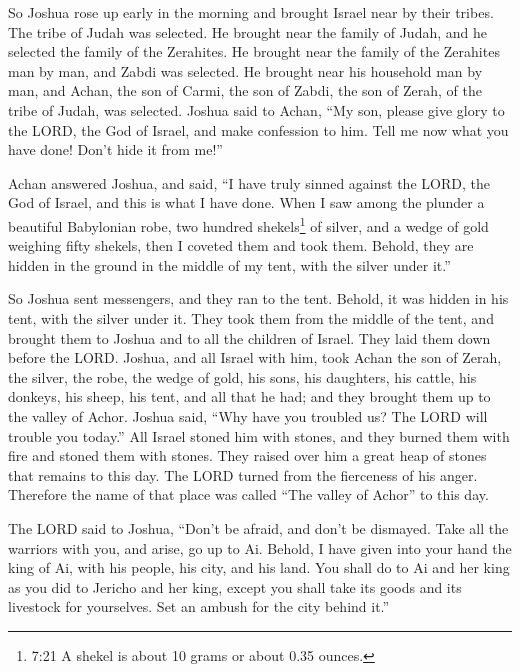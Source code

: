 \myverse{}So Joshua rose up early in the morning and brought Israel near
by their tribes. The tribe of Judah was selected.
\myverse{}He brought near the family of Judah, and he selected the family of the Zerahites.
He brought near the family of the Zerahites man by man, and Zabdi was selected.
\myverse{}He brought near his household man by man, and Achan, the son of Carmi, the
son of Zabdi, the son of Zerah, of the tribe of Judah, was selected.
\myverse{}Joshua said to Achan, “My son, please give glory to the LORD, the God of Israel,
and make confession to him. Tell me now what you have done! Don’t hide it from me!”

\myverse{}Achan answered Joshua, and said, “I have truly sinned against
the LORD, the God of Israel, and this is what I have done.
\myverse{}When I saw among the plunder a beautiful Babylonian robe, two hundred shekels\footnote{7:21 A shekel is about 10 grams or about 0.35 ounces.} of silver, and a wedge of gold weighing
fifty shekels, then I coveted them and took them. Behold, they are hidden in the ground in the middle
of my tent, with the silver under it.”

\myverse{}So Joshua sent messengers, and they ran to the tent. Behold,
it was hidden in his tent, with the silver under it.
\myverse{}They took them from the middle of the tent, and brought them to Joshua and
to all the children of Israel. They laid them down before the LORD.
\myverse{}Joshua, and all Israel with him, took Achan the son of Zerah, the silver,
the robe, the wedge of gold, his sons, his daughters, his cattle, his donkeys, his sheep, his tent, and
all that he had; and they brought them up to the valley of Achor.
\myverse{}Joshua said, “Why have you troubled us? The LORD will trouble you today.”
All Israel stoned him with stones, and they burned them with fire and stoned them with stones.
\myverse{}They raised over him a great heap of stones that remains to this day. The
LORD turned from the fierceness of his anger. Therefore the name of that place was called “The valley
of Achor” to this day.


\mychapter{} \myverse*{}The LORD said to Joshua, “Don’t be afraid, and don’t be dismayed.
Take all the warriors with you, and arise, go up to Ai. Behold, I have given into your hand the king of
Ai, with his people, his city, and his land.
\myverse{}You shall do to Ai and her king as you did to Jericho and her king, except you
shall take its goods and its livestock for yourselves. Set an ambush for the city behind it.”


